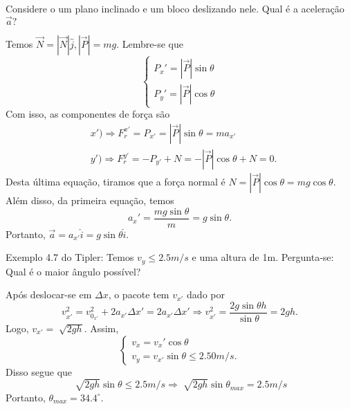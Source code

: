 \documentclass[PhysicsI/physics_notes.tex]{subfiles}
\begin{document}
\begin{example}
	Considere o um plano inclinado e um bloco deslizando nele. Qual é a aceleração $\vec{a}?$
	\begin{center}
	\end{center}
	Temos $\vec{N} = |\vec{N}|\hat{j}, |\vec{P}|=mg.$ Lembre-se que
	$$
		\left\{\begin{array}{ll}
			P_{x}' = |\vec{P}|\sin{\theta} \\
			P_{y}' = |\vec{P}|\cos{\theta}
		\end{array}\right.
	$$
	Com isso, as componentes de força são
	\begin{align*}
		 & x') \Rightarrow F_{r}^{x'} = P_{x'} = |\vec{P}|\sin{\theta} = ma_{x'}      \\
		 & y') \Rightarrow F_{r}^{y'} = -P_{y'} + N = -|\vec{P}|\cos{\theta} + N = 0.
	\end{align*}
	Desta última equação, tiramos que a força normal é $N = |\vec{P}|\cos{\theta} = mg\cos{\theta}.$ Além disso,
	da primeira equação, temos
	$$
		a_{x}' = \frac{mg\sin{\theta}}{m} = g\sin{\theta}.
	$$
	Portanto, $\vec{a} = a_{x'}\hat{i} = g\sin{\theta}\hat{i}.$
\end{example}
\begin{example}
	Exemplo 4.7 do Tipler: Temos $v_{y}\leq 2.5m/s$ e uma altura de 1m. Pergunta-se: Qual é o maior ângulo possível?

	Após deslocar-se em $\Delta x$, o pacote tem $v_{x'}$ dado por
	$$
		v_{x'}^{2} = v_{0_{x'}}^{2} + 2 a_{x'}\Delta x' = 2a_{x'}\Delta x' \Rightarrow v_{x'}^{2} = \frac{2g\sin{\theta}h}{\sin{\theta}} = 2gh.
	$$
	Logo, $v_{x'} = \sqrt[]{2gh}$. Assim,
	$$
		\left\{\begin{array}{ll}
			v_{x} = v_{x}'\cos{\theta} \\
			v_{y} = v_{x'}\sin{\theta}\leq 2.50m/s.
		\end{array}\right.
	$$
	Disso segue que
	$$
		\sqrt[]{2gh}\sin{\theta}\leq 2.5m/s \Rightarrow \sqrt[]{2gh}\sin{\theta_{max}} = 2.5m/s
	$$
	Portanto, $\theta_{max} = 34.4^{\circ}.$
\end{example}
\end{document}
